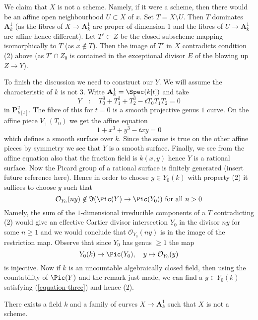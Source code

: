 \medskip\noindent
We claim that $X$ is not a scheme. Namely, if it were a scheme,
then there would be an affine open neighbourhood $U \subset X$ of $x$.
Set $T = X \setminus U$. Then $T$ dominates $\mathbf{A}^1_k$
(as the fibres of $X \to \mathbf{A}^1_k$ are proper of dimension $1$
and the fibres of $U \to \mathbf{A}^1_k$ are affine hence different).
Let $T' \subset Z$ be the closed subscheme mapping isomorphically
to $T$ (as $x \not \in T$). Then the image of $T'$ in $X$
contradicts condition (2) above (as $T' \cap Z_0$ is contained in
the exceptional divisor $E$ of the blowing up $Z \to Y$).

\medskip\noindent
To finish the discussion we need to construct our $Y$.
We will assume the characteristic of $k$ is not $3$.
Write $\mathbf{A}^1_k = \Spec(k[t])$ and take
$$
Y \quad : \quad T_0^3 + T_1^3 + T_2^3 - tT_0T_1T_2 = 0
$$
in $\mathbf{P}^2_{k[t]}$. The fibre of this for $t = 0$
is a smooth projective genus $1$ curve. On the affine piece
$V_+(T_0)$ we get the affine equation
$$
1 + x^3 + y^3 - txy = 0
$$
which defines a smooth surface over $k$. Since the same is true on the other
affine pieces by symmetry we see that $Y$ is a smooth surface.
Finally, we see from the affine equation also that the fraction
field is $k(x, y)$ hence $Y$ is a rational surface.
Now the Picard group of a rational surface is finitely generated
(insert future reference here).
Hence in order to choose $y \in Y_0(k)$ with property (2)
it suffices to choose $y$ such that
\begin{equation}
\label{equation-three}
\mathcal{O}_{Y_0}(ny) \not \in \Im(\Pic(Y) \to \Pic(Y_0))
\text{ for all }n > 0
\end{equation}
Namely, the sum of the $1$-dimensional irreducible components of a $T$
contradicting (2) would give an effective Cartier divisor intersection $Y_0$
in the divisor $ny$ for some $n \geq 1$ and we would conclude
that $\mathcal{O}_{Y_0}(ny)$ is in the image of the restriction map.
Observe that since $Y_0$ has genus $\geq 1$ the map
$$
Y_0(k) \to \Pic(Y_0),\quad y \mapsto \mathcal{O}_{Y_0}(y)
$$
is injective. Now if $k$ is an uncountable algebraically closed field,
then using the countability of $\Pic(Y)$ and the remark
just made, we can find a $y \in Y_0(k)$ satisfying (\ref{equation-three})
and hence (2).

\begin{lemma}
\label{lemma-family-of-curves-not-scheme}
There exists a field $k$ and a family of curves
$X \to \mathbf{A}^1_k$ such that $X$ is not a scheme.
\end{lemma}

